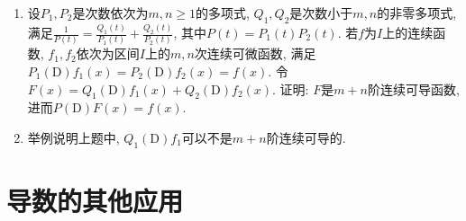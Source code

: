 \begin{3b}
\begin{enumerate}
\item 设\(P_1,P_2\)是次数依次为\(m,n\geqslant 1\)的多项式, 
\(Q_1,Q_2\)是次数小于\(m,n\)的非零多项式, 
满足\(\frac{1}{P(t)}=\frac{Q_1(t)}{P_1(t)}+\frac{Q_2(t)}{P_2(t)}\), 
其中\(P(t)=P_1(t)P_2(t)\). 若\(f\)为\(I\)上的连续函数, 
\(f_1,f_2\)依次为区间\(I\)上的\(m,n\)次连续可微函数, 
满足\(P_1(\mathrm{D})f_1(x)=P_2(\mathrm{D})f_2(x)=f(x)\). 
令\(F(x)=Q_1(\mathrm{D})f_1(x)+Q_2(\mathrm{D})f_2(x)\). 
证明: \(F\)是\(m+n\)阶连续可导函数, 进而\(P(\mathrm{D})F(x)=f(x)\).

\item 举例说明上题中, \(Q_1(\mathrm{D})f_1\)可以不是\(m+n\)阶连续可导的.
\end{enumerate}
\end{3b}

\section{导数的其他应用}
